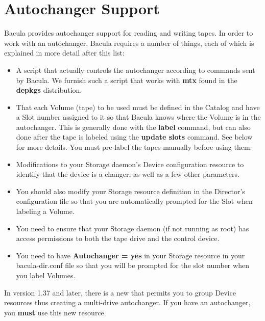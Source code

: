 
\chapter{Autochanger Support}
\label{AutochangersChapter}

Bacula provides autochanger support for reading and writing tapes.  In
order to work with an autochanger, Bacula requires a number of things, each of
which is explained in more detail after this list:

\begin{itemize}
\item A script that actually controls the autochanger according  to commands
   sent by Bacula. We furnish such a script  that works with {\bf mtx} found in
   the {\bf depkgs} distribution. 

\item That each Volume (tape) to be used must be defined in the Catalog and
   have a Slot number assigned to it so that Bacula knows where the Volume is
   in the autochanger. This is generally done with the {\bf label} command, but
   can also done after the tape is labeled using the {\bf update slots}
   command.  See below for more details. You must pre-label the tapes manually
   before using them.

\item Modifications to your Storage daemon's Device configuration  resource to
   identify that the device is a changer, as well  as a few other parameters.  

\item You should also modify your Storage resource definition  in the
   Director's configuration file so that you are automatically prompted for the
   Slot when labeling a Volume. 

\item You need to ensure that your Storage daemon (if not running as root)
   has access permissions to both the tape drive and the control device.

\item You need to have {\bf Autochanger = yes} in your Storage resource
   in your bacula-dir.conf file so that you will be prompted for the
   slot number when you label Volumes.
\end{itemize}

In version 1.37 and later, there is a new  that permits you to group Device resources thus
creating a multi-drive autochanger. If you have an autochanger,
you {\bf must} use this new resource. 

